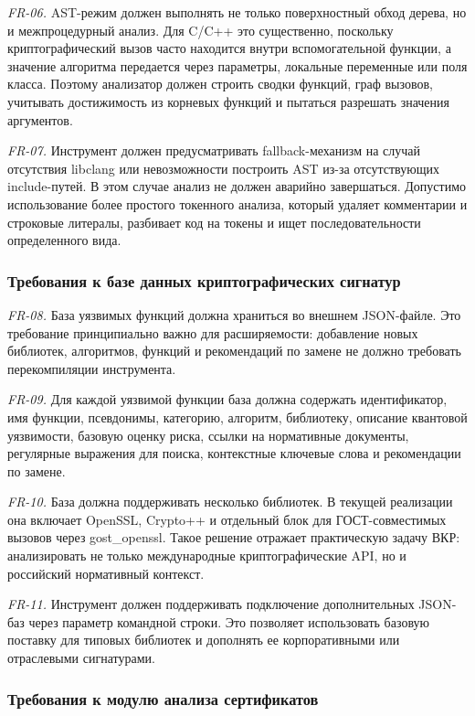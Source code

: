 \documentclass{itmo-vkr}
\begin{document}
	\textit{FR-06.} AST-режим должен выполнять не только поверхностный обход дерева, но и межпроцедурный анализ. Для C/C++ это существенно, поскольку криптографический вызов часто находится внутри вспомогательной функции, а значение алгоритма передается через параметры, локальные переменные или поля класса. Поэтому анализатор должен строить сводки функций, граф вызовов, учитывать достижимость из корневых функций и пытаться разрешать значения аргументов.
	
	\textit{FR-07.} Инструмент должен предусматривать fallback-механизм на случай отсутствия libclang или невозможности построить AST из-за отсутствующих include-путей. В этом случае анализ не должен аварийно завершаться. Допустимо использование более простого токенного анализа, который удаляет комментарии и строковые литералы, разбивает код на токены и ищет последовательности определенного вида.
	
	
	\subsubsection{Требования к базе данных криптографических сигнатур}
	
	\textit{FR-08.} База уязвимых функций должна храниться во внешнем JSON-файле. Это требование принципиально важно для расширяемости: добавление новых библиотек, алгоритмов, функций и рекомендаций по замене не должно требовать перекомпиляции инструмента.
	
	\textit{FR-09.} Для каждой уязвимой функции база должна содержать идентификатор, имя функции, псевдонимы, категорию, алгоритм, библиотеку, описание квантовой уязвимости, базовую оценку риска, ссылки на нормативные документы, регулярные выражения для поиска, контекстные ключевые слова и рекомендации по замене.
	
	\textit{FR-10.} База должна поддерживать несколько библиотек. В текущей реализации она включает OpenSSL, Crypto++ и отдельный блок для ГОСТ-совместимых вызовов через gost\_openssl. Такое решение отражает практическую задачу ВКР: анализировать не только международные криптографические API, но и российский нормативный контекст.
	
	\textit{FR-11.} Инструмент должен поддерживать подключение дополнительных JSON-баз через параметр командной строки. Это позволяет использовать базовую поставку для типовых библиотек и дополнять ее корпоративными или отраслевыми сигнатурами.
	
	
	\subsubsection{Требования к модулю анализа сертификатов}
	
\end{document}
